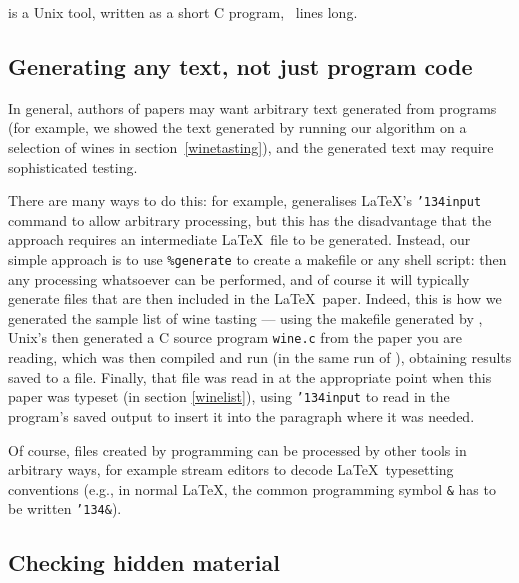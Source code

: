 \documentclass[prodmode,acmtecs]{acmsmall} %
\begin{document}
 is a Unix tool, written as a short C program, \ lines long.

\subsection{Generating any text, not just program code}
In general, authors of papers may want arbitrary text generated from programs (for example, we showed the text generated by running our algorithm on a selection of wines in section~\ref{winetasting}), and the generated text may require sophisticated testing. 

There are many ways to do this:  for example, generalises \LaTeX's \texttt{\char'134input} command to allow arbitrary processing, but this has the disadvantage that the approach requires an intermediate \LaTeX\ file to be generated. Instead, our simple approach is to use \texttt{\%{}generate} to create a makefile or any shell script: then any processing whatsoever can be performed, and of course it will typically generate files that are then included in the \LaTeX\ paper. Indeed, this is how we generated the sample list of wine tasting --- using the makefile generated by , Unix's  then generated a C source program \texttt{wine.c} from the paper you are reading, which was then compiled and run (in the same run of ), obtaining results saved to a file. Finally, that file was read in at the appropriate point when this paper was typeset (in section \ref{winelist}), using \texttt{\char'134input} to read in the program's saved output to insert it into the paragraph where it was needed. 

Of course, files created by  programming can be processed by other tools in arbitrary ways, for example stream editors to decode \LaTeX\ typesetting conventions (e.g., in normal \LaTeX, the common programming symbol \texttt{\&} has to be written \texttt{\char'134\&}).

\subsection{Checking hidden material}\label{invisible-code}
\def\seen{\color{black}\ttfamily\fontseries{l}\selectfont\global\def\endline{}}
\def\hidden{\ttfamily\fontseries{b}\selectfont\emph{$\ast\ast\ast$ hidden $\ast\ast\ast$}}
\def\unseen{\color{highlight-color}\ttfamily\fontseries{b}\selectfont\global\def\endline{\hfill~~\hidden}}
\end{document}
